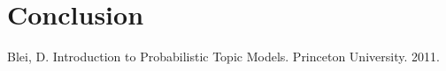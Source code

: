 \documentclass[conference]{IEEEtran}
\begin{document}
\section{Conclusion}

\begin{thebibliography}{1}

Blei, D. Introduction to Probabilistic Topic Models. Princeton University. 2011.
\end{thebibliography}




\end{document}
